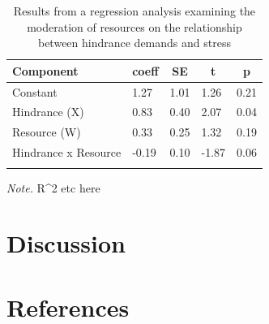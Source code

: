 \documentclass[
  english,
  man]{apa6}
\begin{document}
\begin{table}[tbp]

\begin{center}
\begin{threeparttable}

\caption{\label{tab:table}Results from a regression analysis examining the moderation of resources on the relationship between hindrance demands and stress}

\begin{tabular}{lllll}
\toprule
Component & \multicolumn{1}{c}{coeff} & \multicolumn{1}{c}{SE} & \multicolumn{1}{c}{t} & \multicolumn{1}{c}{p}\\
\midrule
Constant & 1.27 & 1.01 & 1.26 & 0.21\\
Hindrance (X) & 0.83 & 0.40 & 2.07 & 0.04\\
Resource (W) & 0.33 & 0.25 & 1.32 & 0.19\\
Hindrance x Resource & -0.19 & 0.10 & -1.87 & 0.06\\
\bottomrule
\addlinespace
\end{tabular}

\begin{tablenotes}[para]
\normalsize{\textit{Note.} R\textasciicircum{}2 etc here}
\end{tablenotes}

\end{threeparttable}
\end{center}

\end{table}

\hypertarget{discussion}{%
\section{Discussion}\label{discussion}}

\newpage

\hypertarget{references}{%
\section{References}\label{references}}

\begingroup
\setlength{\parindent}{-0.5in}
\setlength{\leftskip}{0.5in}
\end{document}

